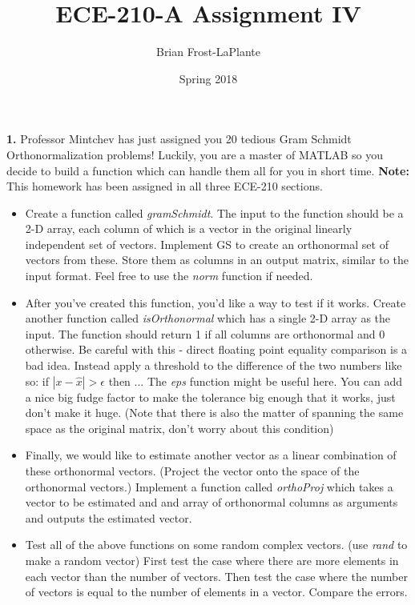 \documentclass{article}
\title{ECE-210-A Assignment IV}
\author{Brian Frost-LaPlante}
\date{Spring 2018}
\begin{document}
\maketitle
\noindent \textbf{1.} Professor Mintchev has just assigned you 20 tedious Gram Schmidt Orthonormalization problems!  Luckily, you are a master of MATLAB so you decide to build a function which can handle them all for you in short time. \textbf{Note:} This homework has been assigned in all three ECE-210 sections.
\begin{itemize}
\item 
Create a function called \emph{gramSchmidt}.  The input to the function should be a 2-D array, each column of which is a vector in the original linearly independent set of vectors. Implement GS to create an orthonormal set of vectors from these. Store them as columns in an output matrix, similar to the input format.  Feel free to use the \emph{norm} function if needed.

\item 
After you've created this function, you'd like a way to test if it works.  Create another function called \emph{isOrthonormal} which has a single 2-D array as the input.  The function should return 1 if all columns are orthonormal and 0 otherwise.  Be careful with this - direct floating point equality comparison is a bad idea.  Instead apply a threshold to the difference of the two numbers like so: if $|x-\hat{x}| > \epsilon$ then ... The \emph{eps} function might be useful here.  You can add a nice big fudge factor to make the tolerance big enough that it works, just don't make it huge.  (Note that there is also the matter of spanning the same space as the original matrix, don't worry about this condition)

\item
Finally, we would like to estimate another vector as a linear combination of these orthonormal vectors. (Project the vector onto the space of the orthonormal vectors.)  Implement a function called \emph{orthoProj} which takes a vector to be estimated and and array of orthonormal columns as arguments and outputs the estimated vector.

\item Test all of the above functions on some random complex vectors. (use \emph{rand} to make a random vector) First test the case where there are more elements in each vector than the number of vectors.  Then test the case where the number of vectors is equal to the number of elements in a vector.  Compare the errors.


\end{itemize}
\end{document}
